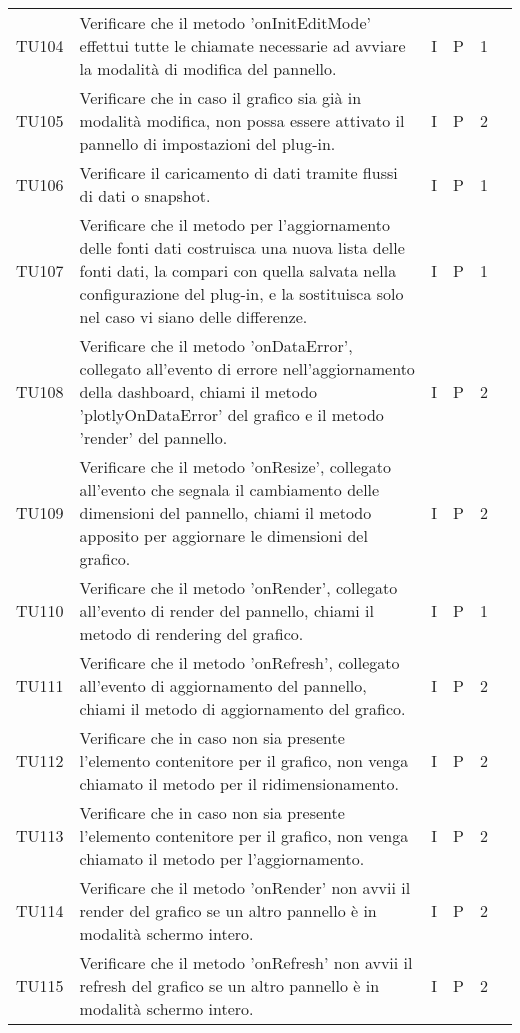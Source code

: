 \begin{longtable} {
		>{}p{12mm}
		>{}p{79.5mm}
		>{}p{9mm}
		>{}p{8mm}
		>{}p{14mm}
		>{}p{0mm}}
	TU104		& Verificare che il metodo 'onInitEditMode' effettui tutte le chiamate necessarie ad avviare la modalità di modifica del pannello. & I & P & 1 & \TBstrut \\ [2mm]
	TU105		& Verificare che in caso il grafico sia già in modalità modifica, non possa essere attivato il pannello di impostazioni del plug-in. & I & P & 2 & \TBstrut \\ [2mm]
	TU106		& Verificare il caricamento di dati tramite flussi di dati o snapshot. & I & P & 1 & \TBstrut \\ [2mm]
	TU107		& Verificare che il metodo per l'aggiornamento delle fonti dati costruisca una nuova lista delle fonti dati, la compari con quella salvata nella configurazione del plug-in, e la sostituisca solo nel caso vi siano delle differenze. & I & P & 1 & \TBstrut \\ [2mm]
	TU108		& Verificare che il metodo 'onDataError', collegato all'evento di errore nell'aggiornamento della dashboard, chiami il metodo 'plotlyOnDataError' del grafico e il metodo 'render' del pannello. & I & P & 2 & \TBstrut \\ [2mm]
	TU109		& Verificare che il metodo 'onResize', collegato all'evento che segnala il cambiamento delle dimensioni del pannello, chiami il metodo apposito per aggiornare le dimensioni del grafico. & I & P & 2 & \TBstrut \\ [2mm]
	TU110		& Verificare che il metodo 'onRender', collegato all'evento di render del pannello, chiami il metodo di rendering del grafico. & I & P & 1 & \TBstrut \\ [2mm]
	TU111		& Verificare che il metodo 'onRefresh', collegato all'evento di aggiornamento del pannello, chiami il metodo di aggiornamento del grafico. & I & P & 2 & \TBstrut \\ [2mm]
	TU112		& Verificare che in caso non sia presente l'elemento contenitore per il grafico, non venga chiamato il metodo per il ridimensionamento. & I & P & 2 & \TBstrut \\ [2mm]
	TU113		& Verificare che in caso non sia presente l'elemento contenitore per il grafico, non venga chiamato il metodo per l'aggiornamento. & I & P & 2 & \TBstrut \\ [2mm]
	TU114		& Verificare che il metodo 'onRender' non avvii il render del grafico se un altro pannello è in modalità schermo intero. & I & P & 2 & \TBstrut \\ [2mm]
	TU115		& Verificare che il metodo 'onRefresh' non avvii il refresh del grafico se un altro pannello è in modalità schermo intero. & I & P & 2 & \TBstrut \\ [2mm]

\end{longtable}
